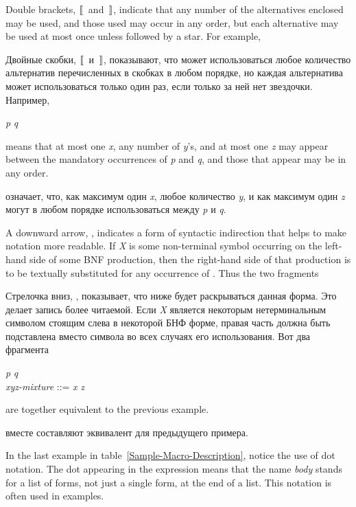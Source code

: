 \begin{newer}
Double brackets, $\dlbrack$ and $\drbrack$, indicate that any number of the
alternatives enclosed may be used, and those used
may occur in any order, but each
alternative may be used at most once unless followed by a star.
For example,

Двойные скобки, $\dlbrack$ и $\drbrack$, показывают, что может использоваться
любое количество альтернатив перечисленных в скобках в любом порядке, но каждая
альтернатива может использоваться только один раз, если только за ней нет
звездочки.
Например,
\begin{tabbing}
\textit{p}  \textit{q}
\end{tabbing}
means that
at most one \textit{x}, any number of \textit{y}'s, and at most one \textit{z}
may appear between the mandatory occurrences of \textit{p}
and \textit{q}, and those that appear may be in any order.

означает, что, как максимум один \textit{x}, любое количество \textit{y}, и как максимум
один \textit{z} могут в любом порядке использоваться между \textit{p} и \textit{q}.

A downward arrow, \Mind{}, indicates a form of syntactic indirection
that helps to make \Mchoice{~} notation more readable.  If \textit{X} is
some non-terminal symbol occurring on the left-hand side of some BNF
production, then the right-hand
side of that production is to be textually substituted for any occurrence
of .  Thus the two fragments

Стрелочка вниз, \Mind{}, показывает, что ниже будет раскрываться данная
форма. Это делает запись \Mchoice{~} более читаемой. Если \textit{X} является
некоторым нетерминальным символом стоящим слева в некоторой БНФ форме, правая
часть должна быть подставлена вместо символа  во всех случаях его
использования. Вот два фрагмента

\begin{tabbing}
\textit{p}  \textit{q} \\
\textit{xyz-mixture} ::= \textit{x\/} {\Mor}  {\Mor} \textit{z\/}
\end{tabbing}
are together equivalent to the previous example.

вместе составляют эквивалент для предыдущего примера.
\end{newer}

In the last example in table~\ref{Sample-Macro-Description}, notice the
use of dot notation.  The dot appearing in the expression
 means that the name \textit{body} stands
for a list of forms, not just a single form, at the end of a list.  This
notation is often used in examples.

